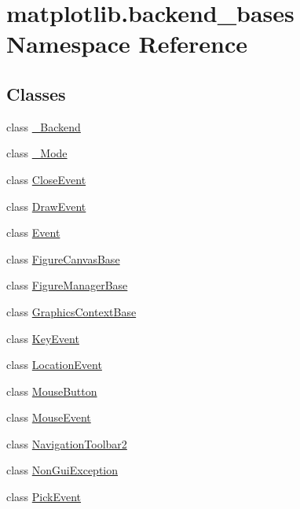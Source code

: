 \hypertarget{namespacematplotlib_1_1backend__bases}{}\section{matplotlib.\+backend\+\_\+bases Namespace Reference}
\label{namespacematplotlib_1_1backend__bases}
\subsection*{Classes}
\begin{DoxyCompactItemize}
\item 
class \hyperlink{classmatplotlib_1_1backend__bases_1_1__Backend}{\+\_\+\+Backend}
\item 
class \hyperlink{classmatplotlib_1_1backend__bases_1_1__Mode}{\+\_\+\+Mode}
\item 
class \hyperlink{classmatplotlib_1_1backend__bases_1_1CloseEvent}{Close\+Event}
\item 
class \hyperlink{classmatplotlib_1_1backend__bases_1_1DrawEvent}{Draw\+Event}
\item 
class \hyperlink{classmatplotlib_1_1backend__bases_1_1Event}{Event}
\item 
class \hyperlink{classmatplotlib_1_1backend__bases_1_1FigureCanvasBase}{Figure\+Canvas\+Base}
\item 
class \hyperlink{classmatplotlib_1_1backend__bases_1_1FigureManagerBase}{Figure\+Manager\+Base}
\item 
class \hyperlink{classmatplotlib_1_1backend__bases_1_1GraphicsContextBase}{Graphics\+Context\+Base}
\item 
class \hyperlink{classmatplotlib_1_1backend__bases_1_1KeyEvent}{Key\+Event}
\item 
class \hyperlink{classmatplotlib_1_1backend__bases_1_1LocationEvent}{Location\+Event}
\item 
class \hyperlink{classmatplotlib_1_1backend__bases_1_1MouseButton}{Mouse\+Button}
\item 
class \hyperlink{classmatplotlib_1_1backend__bases_1_1MouseEvent}{Mouse\+Event}
\item 
class \hyperlink{classmatplotlib_1_1backend__bases_1_1NavigationToolbar2}{Navigation\+Toolbar2}
\item 
class \hyperlink{classmatplotlib_1_1backend__bases_1_1NonGuiException}{Non\+Gui\+Exception}
\item 
class \hyperlink{classmatplotlib_1_1backend__bases_1_1PickEvent}{Pick\+Event}

\end{DoxyCompactItemize}
